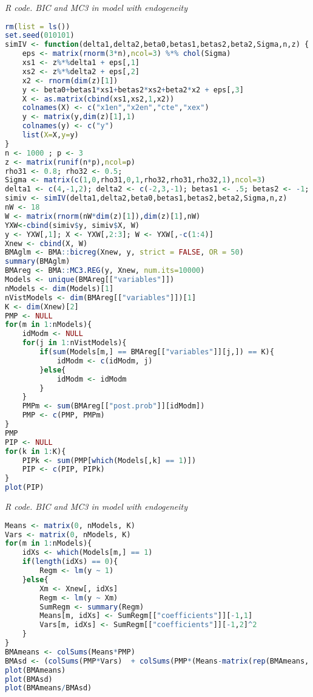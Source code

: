 \begin{enumerate}[leftmargin=*]
\begin{tcolorbox}[enhanced,width=4.67in,center upper,
	fontupper=\large\bfseries,drop shadow southwest,sharp corners]
	\textit{R code. BIC and MC3 in model with endogeneity}
	\begin{VF}
		\begin{lstlisting}[language=R]
rm(list = ls())
set.seed(010101)
simIV <- function(delta1,delta2,beta0,betas1,betas2,beta2,Sigma,n,z) {
	eps <- matrix(rnorm(3*n),ncol=3) %*% chol(Sigma)
	xs1 <- z%*%delta1 + eps[,1]
	xs2 <- z%*%delta2 + eps[,2]
	x2 <- rnorm(dim(z)[1])
	y <- beta0+betas1*xs1+betas2*xs2+beta2*x2 + eps[,3]
	X <- as.matrix(cbind(xs1,xs2,1,x2)) 
	colnames(X) <- c("x1en","x2en","cte","xex")
	y <- matrix(y,dim(z)[1],1)
	colnames(y) <- c("y")
	list(X=X,y=y)
}
n <- 1000 ; p <- 3 
z <- matrix(runif(n*p),ncol=p)
rho31 <- 0.8; rho32 <- 0.5;
Sigma <- matrix(c(1,0,rho31,0,1,rho32,rho31,rho32,1),ncol=3)
delta1 <- c(4,-1,2); delta2 <- c(-2,3,-1); betas1 <- .5; betas2 <- -1; beta2 <- 1; beta0 <- 2
simiv <- simIV(delta1,delta2,beta0,betas1,betas2,beta2,Sigma,n,z)
nW <- 18
W <- matrix(rnorm(nW*dim(z)[1]),dim(z)[1],nW)
YXW<-cbind(simiv$y, simiv$X, W)
y <- YXW[,1]; X <- YXW[,2:3]; W <- YXW[,-c(1:4)]
Xnew <- cbind(X, W)
BMAglm <- BMA::bicreg(Xnew, y, strict = FALSE, OR = 50) 
summary(BMAglm)
BMAreg <- BMA::MC3.REG(y, Xnew, num.its=10000)
Models <- unique(BMAreg[["variables"]])
nModels <- dim(Models)[1]
nVistModels <- dim(BMAreg[["variables"]])[1]
K <- dim(Xnew)[2]
PMP <- NULL
for(m in 1:nModels){
	idModm <- NULL
	for(j in 1:nVistModels){
		if(sum(Models[m,] == BMAreg[["variables"]][j,]) == K){
			idModm <- c(idModm, j)
		}else{
			idModm <- idModm
		} 
	}
	PMPm <- sum(BMAreg[["post.prob"]][idModm])
	PMP <- c(PMP, PMPm)
}
PMP
PIP <- NULL
for(k in 1:K){
	PIPk <- sum(PMP[which(Models[,k] == 1)])
	PIP <- c(PIP, PIPk)
}
plot(PIP)
\end{lstlisting}
	\end{VF}
\end{tcolorbox} 

\begin{tcolorbox}[enhanced,width=4.67in,center upper,
	fontupper=\large\bfseries,drop shadow southwest,sharp corners]
	\textit{R code. BIC and MC3 in model with endogeneity}
	\begin{VF}
		\begin{lstlisting}[language=R]
Means <- matrix(0, nModels, K)
Vars <- matrix(0, nModels, K)
for(m in 1:nModels){
	idXs <- which(Models[m,] == 1)
	if(length(idXs) == 0){
		Regm <- lm(y ~ 1)
	}else{
		Xm <- Xnew[, idXs]
		Regm <- lm(y ~ Xm)
		SumRegm <- summary(Regm)
		Means[m, idXs] <- SumRegm[["coefficients"]][-1,1]
		Vars[m, idXs] <- SumRegm[["coefficients"]][-1,2]^2 
	}
}
BMAmeans <- colSums(Means*PMP)
BMAsd <- (colSums(PMP*Vars)  + colSums(PMP*(Means-matrix(rep(BMAmeans, each = nModels), nModels, K))^2))^0.5 
plot(BMAmeans)
plot(BMAsd)
plot(BMAmeans/BMAsd)
\end{lstlisting}
	\end{VF}
\end{tcolorbox}


\end{enumerate}
